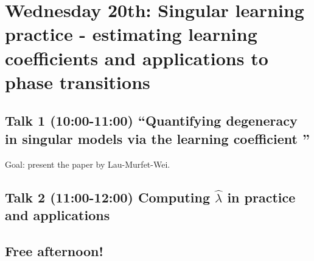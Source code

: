 \documentclass[a4paper,11pt]{amsart}
\newcommand{\lambdahat}{\widehat{\lambda}}
\begin{document}
\section*{Wednesday 20th: Singular learning practice - estimating learning coefficients and applications to phase transitions}

\subsection*{Talk 1 (10:00-11:00) ``Quantifying degeneracy in singular models via the learning coefficient ''}

Goal: present the paper \cite{lambdahat} by Lau-Murfet-Wei.

\subsection*{Talk 2 (11:00-12:00) Computing $\lambdahat$ in practice and applications}

\subsection*{Free afternoon!}






\end{document}
